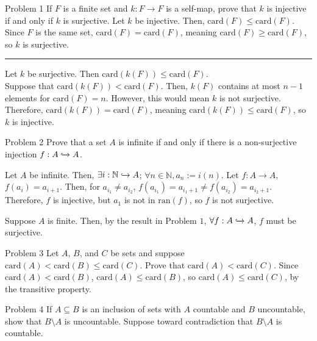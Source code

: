 \documentclass[10pt]{extarticle}
\title{}
\author{Avinash Iyer}
\date{}
\begin{document}
{
  \begin{problem}{Problem 1}
    If $F$ is a finite set and $k:F\rightarrow F$ is a self-map, prove that $k$ is injective if and only if $k$ is surjective.
    \tcblower
    Let $k$ be injective. Then, $\text{card}(F) \leq \text{card}(F)$.\\

    Since $F$ is the same set, $\text{card}(F) = \text{card}(F)$, meaning $\text{card}(F) \geq \text{card}(F)$, so $k$ is surjective.
    \rule{\textwidth}{0.4pt}
    Let $k$ be surjective. Then $\text{card}(k(F)) \leq \text{card}(F)$.\\

    Suppose that $\text{card}(k(F)) < \text{card}(F)$. Then, $k(F)$ contains at most $n-1$ elements for $\text{card}(F) = n$. However, this would mean $k$ is not surjective.\\

    Therefore, $\text{card}(k(F)) = \text{card}(F)$, meaning $\text{card}(k(F)) \leq \text{card}(F)$, so $k$ is injective.
  \end{problem}
  \begin{problem}{Problem 2}
    Prove that a set $A$ is infinite if and only if there is a non-surjective injection $f:A\xhookrightarrow{} A$.
    \tcblower
    \begin{description}[font=\normalfont]
      \item[$(\Rightarrow)$] Let $A$ be infinite. Then, $\exists i: \mathbb{N}\xhookrightarrow{} A$; $\forall n\in \mathbb{N}, a_n:=i(n)$. Let $f: A\rightarrow A$, $f(a_i) = a_{i+1}$. Then, for $a_{i_1} \neq a_{i_2}$, $f(a_{i_1}) = a_{i_1 + 1} \neq f(a_{i_2}) = a_{i_2 + 1}$. Therefore, $f$ is injective, but $a_1$ is not in $\text{ran}(f)$, so $f$ is not surjective.
      \item[$(\Leftarrow)$] Suppose $A$ is finite. Then, by the result in Problem $1$, $\forall f: A\xhookrightarrow{} A$, $f$ must be surjective.
    \end{description}
  \end{problem}
  \begin{problem}{Problem 3}
    Let $A$, $B$, and $C$ be sets and suppose $\textrm{card}(A) < \textrm{card}(B) \leq \textrm{card}(C)$. Prove that $\textrm{card}(A) < \textrm{card}(C)$.
    \tcblower
    Since $\text{card}(A) < \text{card}(B)$, $\text{card}(A) \leq \text{card}(B)$, so $\text{card}(A) \leq \text{card}(C)$, by the transitive property.
  \end{problem}
  \begin{problem}{Problem 4}
    If $A\subseteq B$ is an inclusion of sets with $A$ countable and $B$ uncountable, show that $B\setminus A$ is uncountable.
    \tcblower
    Suppose toward contradiction that $B\setminus A$ is countable.\\


\end{problem}}
\end{document}
